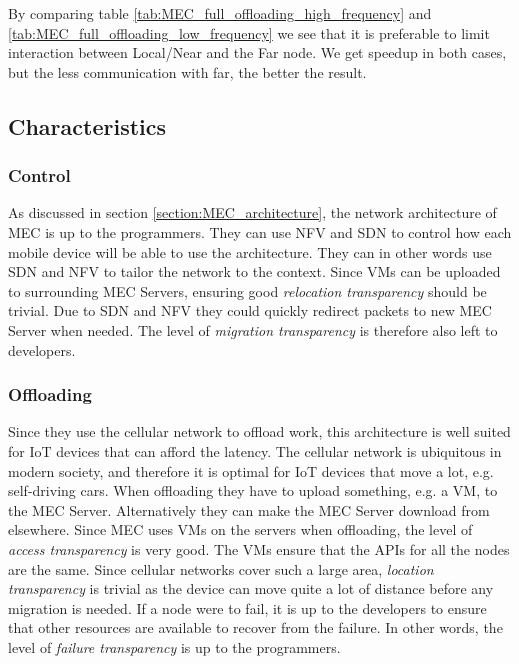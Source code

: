 By comparing table \ref{tab:MEC_full_offloading_high_frequency} and \ref{tab:MEC_full_offloading_low_frequency} we see that it is preferable to limit interaction between Local/Near and the Far node. We get speedup in both cases, but the less communication with far, the better the result. 








\subsection{Characteristics}

\subsubsection{Control}
As discussed in section \ref{section:MEC_architecture}, the network architecture of MEC is up to the programmers. They can use NFV and SDN to control how each mobile device will be able to use the architecture. They can in other words use SDN and NFV to tailor the network to the context. Since VMs can be uploaded to surrounding MEC Servers, ensuring good \textit{relocation transparency} should be trivial. Due to SDN and NFV they could quickly redirect packets to new MEC Server when needed. The level of \textit{migration transparency} is therefore also left to developers.

\subsubsection{Offloading}
Since they use the cellular network to offload work, this architecture is well suited for IoT devices that can afford the latency. The cellular network is ubiquitous in modern society, and therefore it is optimal for IoT devices that move a lot, e.g. self-driving cars. When offloading they have to upload something, e.g. a VM, to the MEC Server. Alternatively they can make the MEC Server download from elsewhere. Since MEC uses VMs on the servers when offloading, the level of \textit{access transparency} is very good. The VMs ensure that the APIs for all the nodes are the same. Since cellular networks cover such a large area, \textit{location transparency} is trivial as the device can move quite a lot of distance before any migration is needed. If a node were to fail, it is up to the developers to ensure that other resources are available to recover from the failure. In other words, the level of \textit{failure transparency} is up to the programmers.


